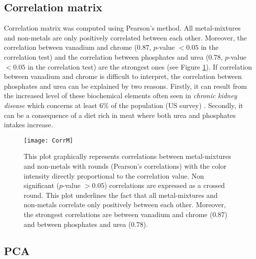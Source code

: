 \subsection{Correlation matrix}
Correlation matrix was computed using Pearson's method. All metal-mixtures and non-metals are only positively correlated between each other. Moreover, the correlation between vanadium and chrome (0.87, $p$-value $<0.05$ in the correlation test) and the correlation between phosphates and urea (0.78, $p$-value $<0.05$ in the correlation test) are the strongest ones (see Figure \ref{fig:correlation_metals}). If correlation between vanadium and chrome is difficult to interpret, the correlation between phosphates and urea can be explained by two reasons. Firstly, it can result from the increased level of these biochemical elements often seen in \emph{chronic kidney disease} which concerns at least 6\% of the population (US survey) \cite{kasper_harrisons_2015}. Secondly, it can be a consequence of a diet rich in meat where both urea and phosphates intakes increase.

\begin{figure}
\centering
\captionsetup{singlelinecheck = false, format= hang, justification=raggedright, font=small, labelsep=space}
\texttt{[image: CorrM]}
  \label{fig:correlation_metals}
\begin{flushleft}
{\footnotesize This plot graphically represents correlations between metal-mixtures and non-metals with rounds (Pearson's correlations) with the color intensity directly proportional to the correlation value. Non significant ($p$-value $>0.05$) correlations are expressed as a crossed round. This plot underlines the fact that all metal-mixtures and non-metals correlate only positively between each other. Moreover, the strongest correlations are between vanadium and chrome (0.87) and between phosphates and urea (0.78).}
\end{flushleft}
\end{figure}

\subsection{PCA}

